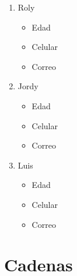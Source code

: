 \documentclass[11pt,a4paper]{article}
\begin{document}
\begin{enumerate}
\item Roly 
\begin{itemize}
\item Edad
\item Celular
\item Correo
\end{itemize}
\item Jordy
\begin{itemize}
\item Edad
\item Celular
\item Correo
\end{itemize}
\item Luis
\begin{itemize}
\item Edad
\item Celular
\item Correo
\end{itemize}
\end{enumerate}


\section{Cadenas}
\end{document}
